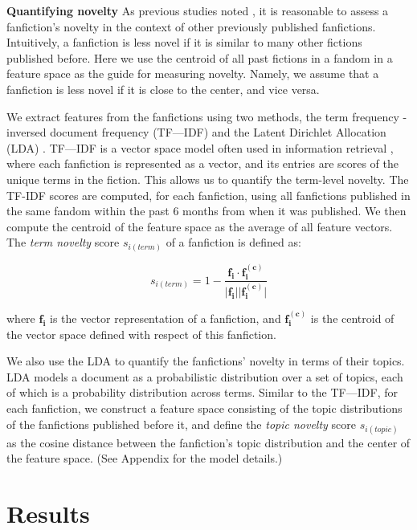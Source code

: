 \documentclass[letterpaper]{article} %
\begin{document}
\textbf{Quantifying novelty}   As previous studies noted \cite{askin2017makes,de2015game}, it is reasonable to assess a fanfiction's novelty in the context of other previously published fanfictions. Intuitively, a fanfiction is less novel if it is similar to many other fictions published before. Here we use the centroid of all past fictions in a fandom in a feature space as the guide for measuring novelty. Namely, we assume that a fanfiction is less novel if it is close to the center, and vice versa. 

We extract features from the fanfictions using two methods, the term frequency - inversed document frequency (TF---IDF) and the Latent Dirichlet Allocation (LDA) \cite{blei2003latent}. TF---IDF is a vector space model often used in information retrieval \cite{salton1988term}, where each fanfiction is represented as a vector, and its entries are scores of the unique terms in the fiction. This allows us to quantify the term-level novelty. The TF-IDF scores are computed, for each fanfiction, using all fanfictions published in the same fandom within the past 6 months from when it was published. We then compute the centroid of the feature space as the average of all feature vectors. The \emph{term novelty} score $s_{i(term)}$ of a fanfiction is defined as:

\begin{equation}
s_{i(term)} = 1-\frac{\boldsymbol{f_i} \cdot{\boldsymbol{f_i^{(c)}}}} {\lvert \boldsymbol{f_i} \rvert \lvert \boldsymbol{f_i^{(c)}} \rvert}
\end{equation}

where $\boldsymbol{f_i}$ is the vector representation of a fanfiction, and $\boldsymbol{f_i^{(c)}}$ is the centroid of the vector space defined with respect of this fanfiction.

We also use the LDA to quantify the fanfictions' novelty in terms of their topics. LDA models a document as a probabilistic distribution over a set of topics, each of which is a probability distribution across terms. Similar to the TF---IDF, for each fanfiction, we construct a feature space consisting of the topic distributions of the fanfictions published before it, and define the \emph{topic novelty} score $s_{i(topic)}$ as the cosine distance between the fanfiction's topic distribution and the center of the feature space. (See Appendix for the model details.)

\section{Results}
\end{document}
